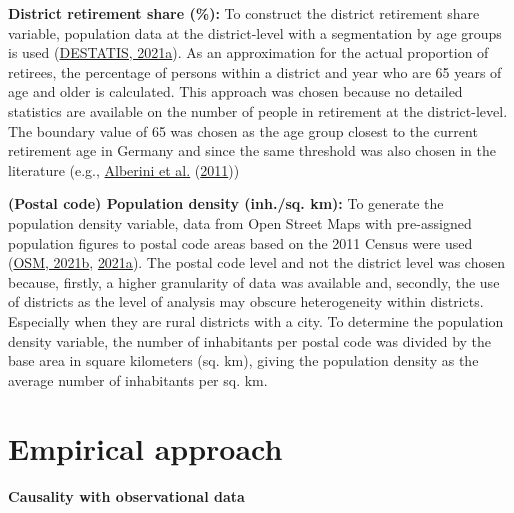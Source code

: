 \documentclass[12pt,twoside]{reedthesis}
\begin{document}
\textbf{District retirement share (\%):} To construct the district retirement share variable, population data at the district-level with a segmentation by age groups is used (\protect\hyperlink{ref-destatis21c}{DESTATIS, 2021a}). As an approximation for the actual proportion of retirees, the percentage of persons within a district and year who are 65 years of age and older is calculated. This approach was chosen because no detailed statistics are available on the number of people in retirement at the district-level. The boundary value of 65 was chosen as the age group closest to the current retirement age in Germany and since the same threshold was also chosen in the literature (e.g., \protect\hyperlink{ref-alberini_etal11}{Alberini et al.} (\protect\hyperlink{ref-alberini_etal11}{2011}))

\textbf{(Postal code) Population density (inh./sq. km):} To generate the population density variable, data from Open Street Maps with pre-assigned population figures to postal code areas based on the 2011 Census were used (\protect\hyperlink{ref-osm21}{OSM, 2021b}, \protect\hyperlink{ref-osm21a}{2021a}). The postal code level and not the district level was chosen because, firstly, a higher granularity of data was available and, secondly, the use of districts as the level of analysis may obscure heterogeneity within districts. Especially when they are rural districts with a city. To determine the population density variable, the number of inhabitants per postal code was divided by the base area in square kilometers (sq. km), giving the population density as the average number of inhabitants per sq. km.

\hypertarget{empirical_model}{%
\section{Empirical approach}\label{empirical_model}}

\textbf{Causality with observational data}
\end{document}
